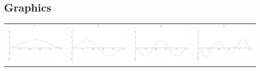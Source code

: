 \documentclass{article}
\begin{document}
\begin{landscape}
\subsection{Graphics}
\begin{tabular}{cccc}
\includegraphics[width=5.0cm]{septic_bspline_1.pdf}& \includegraphics[width=5.0cm]{septic_bspline_2.pdf}& \includegraphics[width=5.0cm]{septic_bspline_3.pdf}& \includegraphics[width=5.0cm]{septic_bspline_4.pdf} \\

\end{tabular}
\end{landscape}
\end{document}
